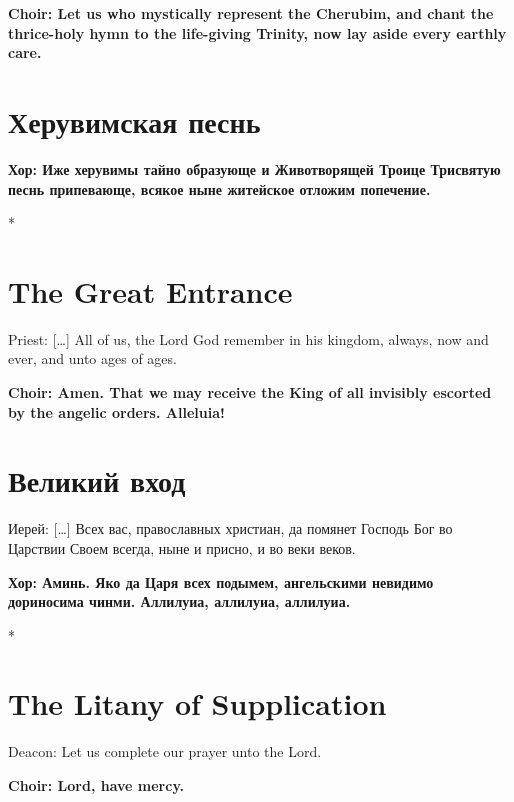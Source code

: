 \documentclass[12pt,a4paper,titlepage]{report}
\begin{document}
\begin{paracol}[1]{2}
	\textbf{Choir: Let us who mystically represent the Cherubim, and chant the thrice-holy hymn to the life-giving Trinity, now lay aside every earthly care.}
	
	\switchcolumn[1]
	
	\section*{Херувимская песнь}
	
	\textbf{Хор: Иже херувимы тайно образующе и Животворящей Троице Трисвятую песнь припевающе, всякое ныне житейское отложим попечение.}
	
	\switchcolumn[0]*
	
	\section*{The Great Entrance}
	
	Priest: [\ldots] All of us, the Lord God remember in his kingdom, always, now and ever, and unto ages of ages.
	
	\textbf{Choir: Amen. That we may receive the King of all invisibly escorted by the angelic orders. Alleluia!}
	
	\switchcolumn[1]
	
	\section*{Великий вход}
	
	Иерей: [\ldots] Всех вас, православных христиан, да помянет Господь Бог во Царствии Своем всегда, ныне и присно, и во веки веков.
	
	\textbf{Хор: Аминь. Яко да Царя всех подымем, ангельскими невидимо дориносима чинми. Аллилуиа, аллилуиа, аллилуиа.}
	
	\switchcolumn[0]*
	
	\section*{The Litany of Supplication}
	
	Deacon: Let us complete our prayer unto the Lord.
	
	\textbf{Choir: Lord, have mercy.}
	

\end{paracol}
\end{document}
